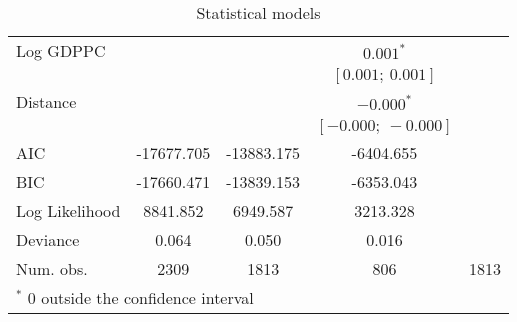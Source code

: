 \begin{table}[H]
\begin{center}
\begin{tabular}{l c c c c }
Log GDPPC      &                   &                     & $0.001^{*}$         &                     \\
               &                   &                     & $[0.001;\ 0.001]$   &                     \\
Distance       &                   &                     & $-0.000^{*}$        &                     \\
               &                   &                     & $[-0.000;\ -0.000]$ &                     \\
\hline
AIC            & -17677.705        & -13883.175          & -6404.655           &                     \\
BIC            & -17660.471        & -13839.153          & -6353.043           &                     \\
Log Likelihood & 8841.852          & 6949.587            & 3213.328            &                     \\
Deviance       & 0.064             & 0.050               & 0.016               &                     \\
Num. obs.      & 2309              & 1813                & 806                 & 1813                \\
\hline
\multicolumn{5}{l}{\scriptsize{$^*$ 0 outside the confidence interval}}
\end{tabular}
\caption{Statistical models}
\label{table:coefficients}
\end{center}
\end{table}
